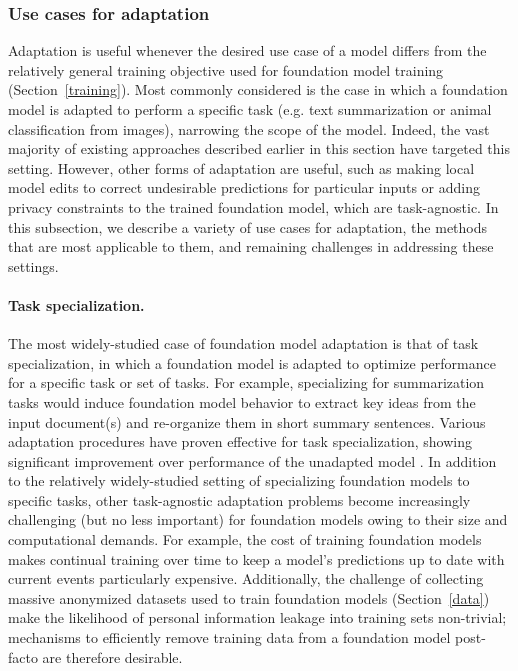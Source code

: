 \subsubsection{Use cases for adaptation}
\label{sec:adaptation-usecases}
Adaptation is useful whenever the desired use case of a model differs from the relatively general training objective used for foundation model training (Section~\ref{training}). Most commonly considered is the case in which a foundation model is adapted to perform a specific task (e.g. text summarization or animal classification from images), narrowing the scope of the model. Indeed, the vast majority of existing approaches described earlier in this section have targeted this setting. However, other forms of adaptation are useful, such as making local model edits to correct undesirable predictions for particular inputs or adding privacy constraints to the trained foundation model, which are task-agnostic. In this subsection, we describe a variety of use cases for adaptation, the methods that are most applicable to them, and remaining challenges in addressing these settings.

\paragraph{Task specialization.} The most widely-studied case of foundation model adaptation is that of task specialization, in which a foundation model is adapted to optimize performance for a specific task or set of tasks. For example, specializing for summarization tasks would induce foundation model behavior to extract key ideas from the input document(s) and re-organize them in short summary sentences. Various adaptation procedures have proven effective for task specialization, showing significant improvement over performance of the unadapted model \citep{howard2018universal,brown2020gpt3}. In addition to the relatively widely-studied setting of specializing foundation models to specific tasks, other task-agnostic adaptation problems become increasingly challenging (but no less important) for foundation models owing to their size and computational demands. For example, the cost of training foundation models makes continual training over time to keep a model’s predictions up to date with current events particularly expensive. Additionally, the challenge of collecting massive anonymized datasets used to train foundation models (Section~\ref{data}) make the likelihood of personal information leakage into training sets non-trivial; mechanisms to efficiently remove training data from a foundation model post-facto are therefore desirable.

